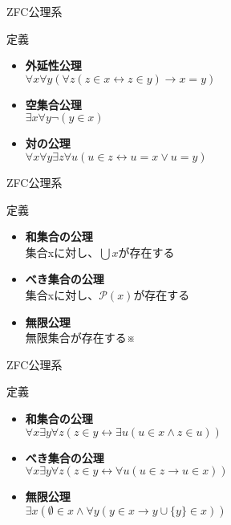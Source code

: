 \documentclass[17pt,aspectratio=169]{beamer}
\begin{document}
\begin{frame}{ZFC公理系}
    \begin{block}{定義}
        \begin{itemize}
            \item \textbf{外延性公理} \\
                  $\forall x \forall y (\forall z (z \in x \leftrightarrow z \in y) \rightarrow x = y)$
            \item \textbf{空集合公理} \\
                  $\exists x \forall y \neg (y \in x)$
            \item \textbf{対の公理} \\
                  $\forall x \forall y \exists z \forall u (u \in z \leftrightarrow u = x \lor u = y)$
        \end{itemize}
    \end{block}
\end{frame}

\begin{frame}{ZFC公理系}
    \begin{block}{定義}
        \begin{itemize}
            \item \textbf{和集合の公理} \\
                  集合xに対し、$\bigcup x$が存在する
            \item \textbf{べき集合の公理} \\
                  集合xに対し、$\mathcal{P}(x)$が存在する
            \item \textbf{無限公理} \\
                  無限集合が存在する※
        \end{itemize}
    \end{block}
\end{frame}

\begin{frame}{ZFC公理系}
    \begin{block}{定義}
        \begin{itemize}
            \item \textbf{和集合の公理} \\
                  $\forall x \exists y \forall z (z \in y \leftrightarrow \exists u (u \in x \land z \in u))$
            \item \textbf{べき集合の公理} \\
                  $ \forall x \exists y \forall z (z \in y \leftrightarrow \forall u (u \in z \rightarrow u \in x))$
            \item \textbf{無限公理} \\
                  $\exists x (\emptyset \in x \land \forall y (y \in x \rightarrow y \cup \{y\} \in x))$
        \end{itemize}
    \end{block}
\end{frame}
\end{document}
